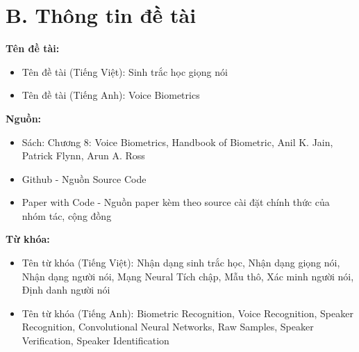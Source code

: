 \documentclass{article}
\begin{document}
	\section{B. Thông tin đề tài}
	
	\textbf{Tên đề tài:} 
	\begin{itemize}
		\item Tên đề tài (Tiếng Việt): Sinh trắc học giọng nói
		\item Tên đề tài (Tiếng Anh): Voice Biometrics
	\end{itemize}
	\textbf{Nguồn:} 
	\begin{itemize}
		\item Sách: Chương 8: Voice Biometrics, Handbook of Biometric, Anil K. Jain, Patrick Flynn, Arun A.
		Ross
		\item Github - Nguồn Source Code
		\item Paper with Code - Nguồn paper kèm theo source cài đặt chính thức của nhóm tác, cộng đồng
	\end{itemize}
	\textbf{Từ khóa:} 
	\begin{itemize}
		\item Tên từ khóa (Tiếng Việt): Nhận dạng sinh trắc học, Nhận dạng giọng nói, Nhận dạng người nói, Mạng Neural Tích chập, Mẫu thô, Xác minh người nói, Định danh người nói
		\item 	Tên từ khóa (Tiếng Anh): Biometric Recognition, Voice Recognition, Speaker Recognition, Convolutional Neural Networks, Raw Samples, Speaker Verification, Speaker Identification
	\end{itemize}
	
\end{document}
